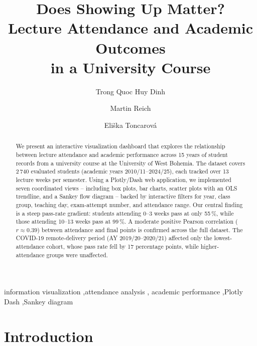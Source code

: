 \documentclass[final,3p,times,twocolumn]{elsarticle}
\begin{document}
\begin{frontmatter}

\title{Does Showing Up Matter?\\
Lecture Attendance and Academic Outcomes\\
in a University Course}

\author[FAV]{Trong Quoc Huy Dinh}
\author[FAV]{Martin Reich}
\author[FAV]{Eli\v{s}ka Toncarov\'{a}}


\address[FAV]{Department of Computer Science and Engineering,
Faculty of Applied Sciences, University of West Bohemia,
Plze\v{n}, Czech Republic}

\begin{abstract}
We present an interactive visualization dashboard that explores the
relationship between lecture attendance and academic performance across
15 years of student records from a university course at the University
of West Bohemia. The dataset covers 2\,740 evaluated students
(academic years 2010/11--2024/25), each tracked over 13 lecture weeks
per semester. Using a Plotly/Dash web application, we implemented seven
coordinated views -- including box plots, bar charts, scatter plots with
an OLS trendline, and a Sankey flow diagram -- backed by interactive
filters for year, class group, teaching day, exam-attempt number, and
attendance range. Our central finding is a steep pass-rate gradient:
students attending 0--3 weeks pass at only 55\,\%, while those
attending 10--13 weeks pass at 99\,\%. A moderate positive Pearson
correlation ($r \approx 0.39$) between attendance and final points
is confirmed across the full dataset. The COVID-19 remote-delivery
period (AY 2019/20--2020/21) affected only the lowest-attendance cohort,
whose pass rate fell by 17 percentage points, while higher-attendance
groups were unaffected.
\end{abstract}

\begin{keyword}
information visualization \sep attendance analysis \sep
academic performance \sep Plotly Dash \sep Sankey diagram
\end{keyword}

\end{frontmatter}

\linenumbers

\section{Introduction}
\end{document}
